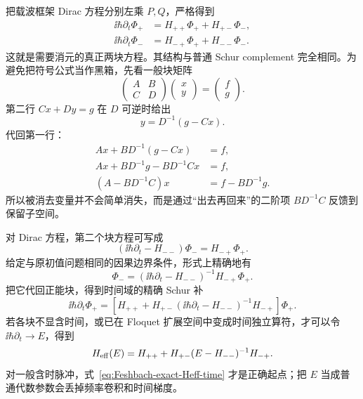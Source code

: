 把载波框架 Dirac 方程分别左乘 $P,Q$，严格得到
\begin{align}
 \ii\hbar\partial_t\Phi_+
 &=H_{++}\Phi_+ +H_{+-}\Phi_-,\\
 \ii\hbar\partial_t\Phi_-
 &=H_{-+}\Phi_+ +H_{--}\Phi_-.
 \label{eq:Feshbach-coupled}
\end{align}
这就是需要消元的真正两块方程。其结构与普通 Schur complement 完全相同。为避免把符号公式当作黑箱，先看一般块矩阵
\begin{equation}
\begin{pmatrix}A&B\\ C&D\end{pmatrix}
\begin{pmatrix}x\\ y\end{pmatrix}
=
\begin{pmatrix}f\\ g\end{pmatrix}.
\label{eq:schur-two-block}
\end{equation}
第二行 $Cx+Dy=g$ 在 $D$ 可逆时给出
\begin{equation}
y=D^{-1}(g-Cx).
\end{equation}
代回第一行：
\begin{align}
Ax+BD^{-1}(g-Cx)&=f,\\
Ax+BD^{-1}g-BD^{-1}Cx&=f,\\
\left(A-BD^{-1}C\right)x&=f-BD^{-1}g.
\label{eq:schur-reduced}
\end{align}
所以被消去变量并不会简单消失，而是通过“出去再回来”的二阶项 $BD^{-1}C$ 反馈到保留子空间。

对 Dirac 方程，第二个块方程可写成
\begin{equation}
 \left(\ii\hbar\partial_t-H_{--}\right)\Phi_-
 =H_{-+}\Phi_+.
 \label{eq:Feshbach-Q-equation}
\end{equation}
给定与原初值问题相同的因果边界条件，形式上精确地有
\begin{equation}
 \boxed{
 \Phi_-
 =\left(\ii\hbar\partial_t-H_{--}\right)^{-1}
 H_{-+}\Phi_+.}
 \label{eq:Feshbach-exact-resolvent}
\end{equation}
把它代回正能块，得到时间域的精确 Schur 补
\begin{equation}
 \boxed{
 \ii\hbar\partial_t\Phi_+
 =\left[
 H_{++}
 +H_{+-}\left(\ii\hbar\partial_t-H_{--}\right)^{-1}H_{-+}
 \right]\Phi_+.}
 \label{eq:Feshbach-exact-Heff-time}
\end{equation}
若各块不显含时间，或已在 Floquet 扩展空间中变成时间独立算符，才可以令 $\ii\hbar\partial_t\to E$，得到
\begin{equation}
H_{\rm eff}(E)
=H_{++}+H_{+-}(E-H_{--})^{-1}H_{-+}.
\label{eq:Feshbach-Schur-energy}
\end{equation}
对一般含时脉冲，式~\eqref{eq:Feshbach-exact-Heff-time} 才是正确起点；把 $E$ 当成普通代数参数会丢掉频率卷积和时间梯度。

